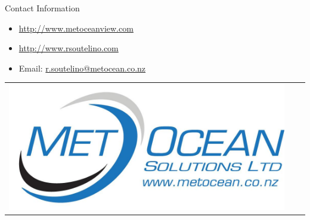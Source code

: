 \documentclass[final]{beamer}
\newlength{\onecolwid}
\begin{document}
\begin{frame}[t]
\begin{columns}[t]
\begin{column}{\onecolwid}

    \begin{block}{Contact Information}

    \begin{small}
    \begin{itemize}
    \item \href{http://www.metoceanview.com}{http://www.metoceanview.com}
    \item \href{http://www.rsoutelino.com}{http://www.rsoutelino.com}
    \item Email: \href{mailto:r.soutelino@metocean.co.nz}{r.soutelino@metocean.co.nz}
    \end{itemize}
    \end{small}

    \end{block}

    \begin{center}
    \begin{tabular}{ccc}
    \includegraphics[width=0.7\linewidth]{msllogo.jpg}
    \end{tabular}
    \end{center}


\end{column} %

\end{columns} %

\end{frame} %
\end{document}
